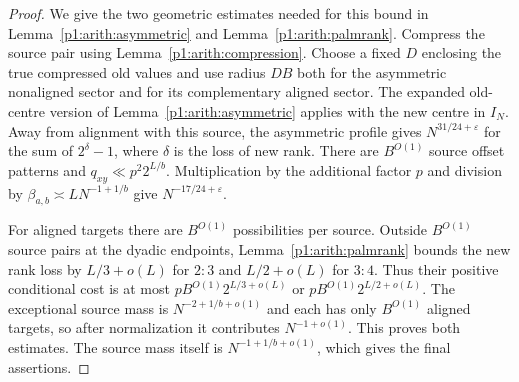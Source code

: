 \begin{proof}
We give the two geometric estimates needed for this bound in
Lemma~\ref{p1:arith:asymmetric} and Lemma~\ref{p1:arith:palmrank}.
Compress the source pair using Lemma~\ref{p1:arith:compression}.
Choose a fixed $D$ enclosing the true compressed old values and use
radius $DB$ both for the asymmetric nonaligned sector and for its
complementary aligned sector.  The expanded old-centre version of
Lemma~\ref{p1:arith:asymmetric} applies with the new centre in $I_N$.
Away from alignment with this source, the asymmetric profile gives
$N^{31/24+\varepsilon}$ for the sum of $2^{\delta}-1$, where $\delta$ is
the loss of new rank.  There are $B^{O(1)}$ source offset patterns and
$q_{xy}\ll p^2 2^{L/b}$.  Multiplication by the additional factor $p$
and division by $\beta_{a,b}\asymp LN^{-1+1/b}$ give
$N^{-17/24+\varepsilon}$.

For aligned targets there are $B^{O(1)}$ possibilities per source.  Outside
$B^{O(1)}$ source pairs at the dyadic endpoints, Lemma~\ref{p1:arith:palmrank}
bounds the new rank loss by $L/3+o(L)$ for $2:3$ and $L/2+o(L)$ for $3:4$.
Thus their positive conditional cost is at most
$pB^{O(1)}2^{L/3+o(L)}$ or $pB^{O(1)}2^{L/2+o(L)}$.
The exceptional source mass is $N^{-2+1/b+o(1)}$ and each has only
$B^{O(1)}$ aligned targets, so after normalization it contributes
$N^{-1+o(1)}$.  This proves both estimates.  The source mass itself is
$N^{-1+1/b+o(1)}$, which gives the final assertions.
\end{proof}
